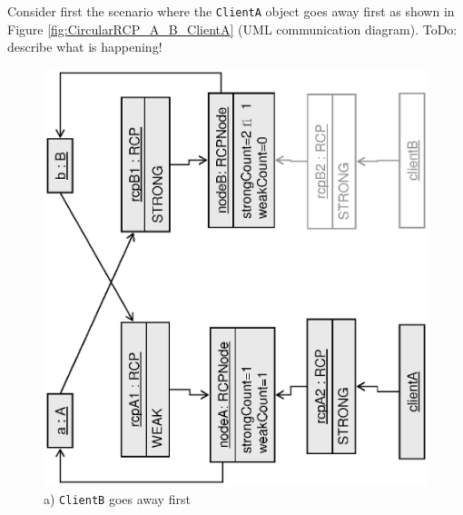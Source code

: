 \documentclass[pdf,ps2pdf,11pt]{SANDreport}
\begin{document}
Consider first the scenario where the {}\texttt{ClientA} object goes
away first as shown in Figure {}\ref{fig:CircularRCP_A_B_ClientA} (UML
communication diagram).  ToDo: describe what is happening!

{\bsinglespace
\begin{figure}
\begin{center}
\includegraphics*[angle=270,scale=0.65]{CircularRCP_A_B_ClientB_1}
\\[2ex] a) {}\texttt{ClientB} goes away first \\[3ex]

\end{center}
\end{figure}}
\end{document}
